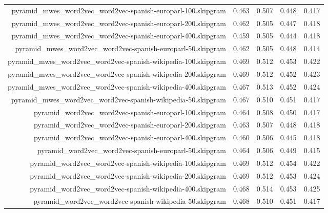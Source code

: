 \begin{figure*}
\begin{centering}
\begin{tabulary}{\textwidth}{|R|L|L|L|L|}
pyramid_mwes_word2vec_word2vec-spanish-europarl-100.skipgram & 0.463 & 0.507 & 0.448 & 0.417 \\
pyramid_mwes_word2vec_word2vec-spanish-europarl-200.skipgram & 0.462 & 0.505 & 0.447 & 0.418 \\
pyramid_mwes_word2vec_word2vec-spanish-europarl-400.skipgram & 0.459 & 0.505 & 0.444 & 0.418 \\
pyramid_mwes_word2vec_word2vec-spanish-europarl-50.skipgram & 0.462 & 0.505 & 0.448 & 0.414 \\
pyramid_mwes_word2vec_word2vec-spanish-wikipedia-100.skipgram & 0.469 & 0.512 & 0.453 & 0.422 \\
pyramid_mwes_word2vec_word2vec-spanish-wikipedia-200.skipgram & 0.469 & 0.512 & 0.452 & 0.423 \\
pyramid_mwes_word2vec_word2vec-spanish-wikipedia-400.skipgram & 0.467 & 0.513 & 0.452 & 0.424 \\
pyramid_mwes_word2vec_word2vec-spanish-wikipedia-50.skipgram & 0.467 & 0.510 & 0.451 & 0.417 \\
pyramid_word2vec_word2vec-spanish-europarl-100.skipgram & 0.464 & 0.508 & 0.450 & 0.417 \\
pyramid_word2vec_word2vec-spanish-europarl-200.skipgram & 0.463 & 0.507 & 0.448 & 0.418 \\
pyramid_word2vec_word2vec-spanish-europarl-400.skipgram & 0.460 & 0.506 & 0.445 & 0.418 \\
pyramid_word2vec_word2vec-spanish-europarl-50.skipgram & 0.464 & 0.506 & 0.449 & 0.415 \\
pyramid_word2vec_word2vec-spanish-wikipedia-100.skipgram & 0.469 & 0.512 & 0.454 & 0.422 \\
pyramid_word2vec_word2vec-spanish-wikipedia-200.skipgram & 0.469 & 0.512 & 0.453 & 0.424 \\
pyramid_word2vec_word2vec-spanish-wikipedia-400.skipgram & 0.468 & 0.514 & 0.453 & 0.425 \\
pyramid_word2vec_word2vec-spanish-wikipedia-50.skipgram & 0.468 & 0.510 & 0.451 & 0.417 \\


\end{tabulary}
\end{centering}
\end{figure*}
